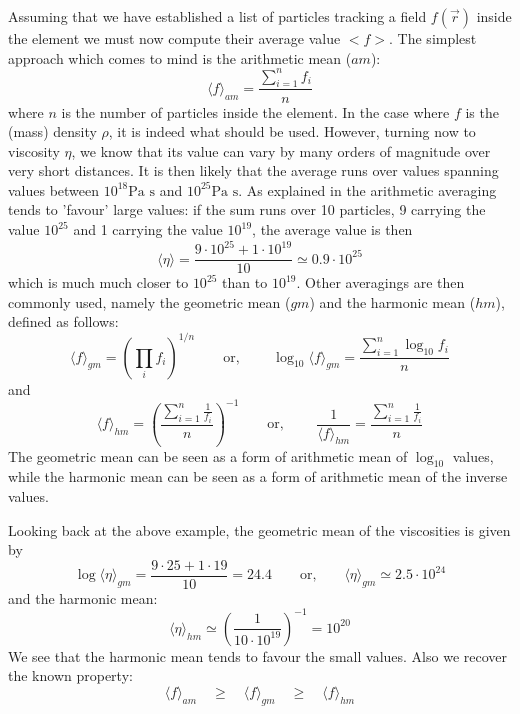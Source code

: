 Assuming that we have established a list of particles tracking a field $f(\vec r)$ inside the 
element 
we must now compute their average value $<f>$. 
The simplest approach which comes to mind is the arithmetic mean ($am$):
\[
\langle f\rangle_{am} = \frac{\sum\limits_{i=1}^n f_i}{n}
\]  
where $n$ is the number of particles inside the element.
In the case where $f$ is the (mass) density $\rho$, it is indeed what should be used. 
However, turning now to viscosity $\eta$, we know that its value can vary by many orders of magnitude 
over very short distances.
It is then likely that the average runs over values spanning values between 
$10^{18}\text{Pa s}$ and $10^{25} \text{Pa s}$.
As explained in \cite{scbe08} the arithmetic averaging tends to 'favour' large values: 
if the sum runs over 
10 particles, 9 carrying the value $10^{25}$ and 1 carrying the value $10^{19}$, 
the average value is then
\[
\langle\eta\rangle = \frac{9\cdot 10^{25}+1\cdot 10^{19}}{10} \simeq 0.9\cdot 10^{25}
\]
which is much much closer to $10^{25}$ than to $10^{19}$.
Other averagings are then commonly used, namely the geometric mean ($gm$)  and the 
harmonic mean ($hm$), defined as follows:
\[
\langle f\rangle_{gm} = \left( \prod_i f_i \right)^{1/n} 
\qquad
\text{or, }
\qquad
\log_{10} \langle f \rangle_{gm} = \frac{\sum\limits_{i=1}^{n} \log_{10} f_i }{n}  
\]
and 
\[
\langle f\rangle_{hm} = \left( \frac{\sum\limits_{i=1}^n \frac{1}{f_i} }{n}  \right)^{-1}
\qquad
\text{or, }
\qquad
\frac{1}{\langle f\rangle_{hm} } = \frac{\sum\limits_{i=1}^n  \frac{1}{f_i} }{n}  
\]
The geometric mean can be seen as a form of arithmetic mean of $\log_{10}$ values, 
while the harmonic mean can be seen as 
a form of arithmetic mean of the inverse values.

Looking back at the above example, the geometric mean of the viscosities is given by 
\[
\log \langle \eta\rangle_{gm} = \frac{9\cdot 25+1\cdot 19}{10} = 24.4 
\qquad \text{or,} \qquad 
\langle \eta\rangle_{gm} \simeq 2.5 \cdot 10^{24}
\]
and the harmonic mean:
\[
\langle\eta\rangle_{hm} \simeq \left( \frac{1}{10 \cdot  10^{19}} \right)^{-1} = 10^{20}
\]
We see that the harmonic mean tends to favour the small values. Also we recover the known property:
\begin{equation}
\langle f \rangle_{am}\quad  \geq \quad
\langle f \rangle_{gm}\quad  \geq \quad
\langle f \rangle_{hm} 
\end{equation}

